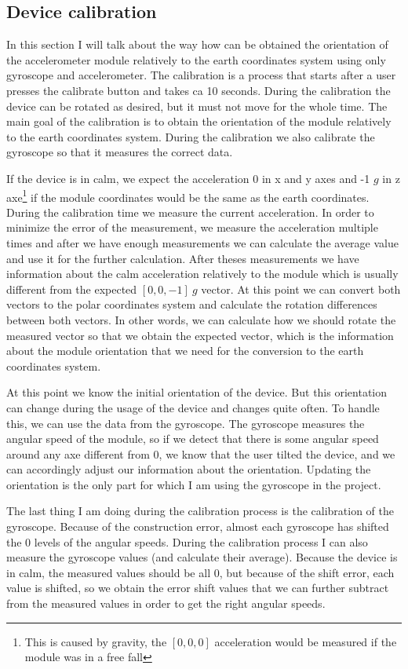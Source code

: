 \documentclass[hidelinks,a4paper]{article}
\begin{document}
\subsection{Device calibration}
In this section I will talk about the way how can be obtained the orientation of the accelerometer module relatively to the earth coordinates system using only gyroscope and accelerometer. The calibration is a process that starts after a user presses the calibrate button and takes ca 10 seconds. During the calibration the device can be rotated as desired, but it must not move for the whole time. The main goal of the calibration is to obtain the orientation of the module relatively to the earth coordinates system. During the calibration we also calibrate the gyroscope so that it measures the correct data.\par
If the device is in calm, we expect the acceleration 0 in x and y axes and -1 $g$ in z axe\footnote{This is caused by gravity, the $[0,0,0]$ acceleration would be measured if the module was in a free fall} if the module coordinates would be the same as the earth coordinates. During the calibration time we measure the current acceleration. In order to minimize the error of the measurement, we measure the acceleration multiple times and after we have enough measurements we can calculate the average value and use it for the further calculation. After theses measurements we have information about the calm acceleration relatively to the module which is usually different from the expected $[0,0,-1]~g$ vector. At this point we can convert both vectors to the polar coordinates system and calculate the rotation differences between both vectors. In other words, we can calculate how we should rotate the measured vector so that we obtain the expected vector, which is the information about the module orientation that we need for the conversion to the earth coordinates system.\par
At this point we know the initial orientation of the device. But this orientation can change during the usage of the device and changes quite often. To handle this, we can use the data from the gyroscope. The gyroscope measures the angular speed of the module, so if we detect that there is some angular speed around any axe different from 0, we know that the user tilted the device, and we can accordingly adjust our information about the orientation. Updating the orientation is the only part for which I am using the gyroscope in the project.\par
The last thing I am doing during the calibration process is the calibration of the gyroscope. Because of the construction error, almost each gyroscope has shifted the 0 levels of the angular speeds. During the calibration process I can also measure the gyroscope values (and calculate their average). Because the device is in calm, the measured values should be all 0, but because of the shift error, each value is shifted, so we obtain the error shift values that we can further subtract from the measured values in order to get the right angular speeds. 
\end{document}
